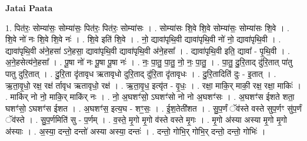 \documentclass[17pt]{extarticle}
\begin{document}
\textbf{Jatai Paata} \newline

1. पित॑रः॒ सोम्या॑सः॒ सोम्या॑सः॒ पित॑रः॒ पित॑रः॒ सोम्या॑सः । . सोम्या॑सः शि॒वे शि॒वे सोम्या॑सः॒ सोम्या॑सः शि॒वे । . शि॒वे नो॑ नः शि॒वे शि॒वे नः॑ । . शि॒वे इति॑ शि॒वे । . नो॒ द्यावा॑पृथि॒वी द्यावा॑पृथि॒वी नो॑ नो॒ द्यावा॑पृथि॒वी । . द्यावा॑पृथि॒वी अ॑ने॒हसा॑ ऽने॒हसा॒ द्यावा॑पृथि॒वी द्यावा॑पृथि॒वी अ॑ने॒हसा᳚ । . द्यावा॑पृथि॒वी इति॒ द्यावा᳚ - पृ॒थि॒वी । . अ॒ने॒हसेत्य॑ने॒हसा᳚ । . पू॒षा नो॑ नः पू॒षा पू॒षा नः॑ । . नः॒ पा॒तु॒ पा॒तु॒ नो॒ नः॒ पा॒तु॒ । . पा॒तु॒ दु॒रि॒ताद् दु॑रि॒तात् पा॑तु पातु दुरि॒तात् । . दु॒रि॒ता दृ॑तावृध ऋतावृधो दुरि॒ताद् दु॑रि॒ता दृ॑तावृधः । . दु॒रि॒तादिति॑ दुः - इ॒तात् । . ऋ॒ता॒वृ॒धो॒ रक्ष॒ रक्ष॑ र्तावृध ऋतावृधो॒ रक्ष॑ । . ऋ॒ता॒वृ॒ध॒ इत्यृ॑त - वृ॒धः॒ । . रक्षा॒ माकि॒र् माकी॒ रक्ष॒ रक्षा॒ माकिः॑ । . माकि॑र् नो नो॒ माकि॒र् माकि॑र् नः । . नो॒ अ॒घशꣳ॑सो॒ ऽघशꣳ॑सो नो नो अ॒घशꣳ॑सः । . अ॒घशꣳ॑स ईशते शता॒ घशꣳ॑सो॒ ऽघशꣳ॑स ईशत । . अ॒घशꣳ॑स॒ इत्य॒घ - शꣳ॒॒सः॒ । . ई॒श॒तेती॑शत । . सु॒प॒र्णं ॅव॑स्ते वस्ते सुप॒र्णꣳ सु॑प॒र्णं ॅव॑स्ते । . सु॒प॒र्णमिति॑ सु - प॒र्णम् । . व॒स्ते॒ मृ॒गो मृ॒गो व॑स्ते वस्ते मृ॒गः । . मृ॒गो अ॑स्या अस्या मृ॒गो मृ॒गो अ॑स्याः । . अ॒स्या॒ दन्तो॒ दन्तो॑ अस्या अस्या॒ दन्तः॑ । . दन्तो॒ गोभि॒र् गोभि॒र् दन्तो॒ दन्तो॒ गोभिः॑ । \newline
\end{document}
